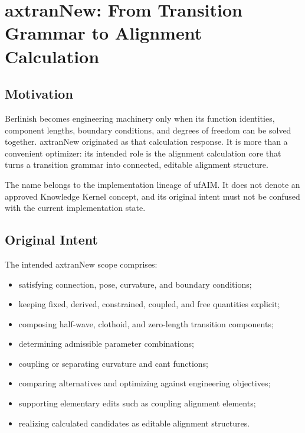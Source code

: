 
\chapter{axtranNew: From Transition Grammar to Alignment Calculation}

\label{chap:axtran-reinterpretation}

\section*{Motivation}

Berlinish becomes engineering machinery only when its function identities,
component lengths, boundary conditions, and degrees of freedom can be solved
together. axtranNew originated as that calculation response. It is more than a
convenient optimizer: its intended role is the alignment calculation core that
turns a transition grammar into connected, editable alignment structure.

The name belongs to the implementation lineage of ufAIM. It does not denote an
approved Knowledge Kernel concept, and its original intent must not be confused
with the current implementation state.

\section{Original Intent}

The intended axtranNew scope comprises:
\begin{itemize}
\item satisfying connection, pose, curvature, and boundary conditions;
\item keeping fixed, derived, constrained, coupled, and free quantities
explicit;
\item composing half-wave, clothoid, and zero-length transition components;
\item determining admissible parameter combinations;
\item coupling or separating curvature and cant functions;
\item comparing alternatives and optimizing against engineering objectives;
\item supporting elementary edits such as coupling alignment elements;
\item realizing calculated candidates as editable alignment structures.
\end{itemize}

